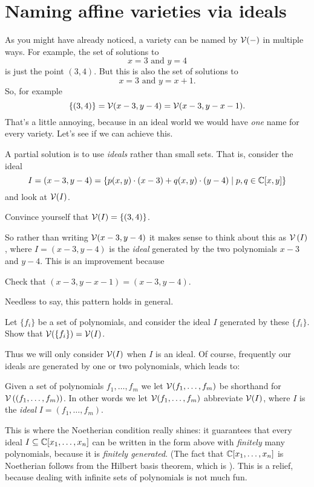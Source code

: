 \section{Naming affine varieties via ideals}
As you might have already noticed, a variety can be named by $\mathcal V(-)$ in multiple ways.
For example, the set of solutions to
\[ x=3 \text{ and } y=4 \]
is just the point $(3,4)$.
But this is also the set of solutions to
\[ x=3 \text{ and } y=x+1. \]
So, for example
\[ \{(3,4)\}
	= \mathcal V(x-3, y-4)
	= \mathcal V(x-3, y-x-1).
	\]
That's a little annoying, because in an ideal world we would have \emph{one} name
for every variety.
Let's see if we can achieve this.

A partial solution is to use \emph{ideals} rather than small sets.
That is, consider the ideal
\[
	I = \left( x-3, y-4 \right)
	= \left\{ p(x,y) \cdot (x-3) + q(x,y) \cdot (y-4)
	\mid p,q \in \mathbb C[x,y] \right\}
\]
and look at $\mathcal V(I)$.
\begin{ques}
	Convince yourself that $\mathcal V(I) = \{(3,4)\}$.
\end{ques}
So rather than writing $\mathcal V(x-3, y-4)$ it makes sense to
think about this as $\mathcal V\left( I \right)$, where $I = (x-3,y-4)$ is the \emph{ideal}
generated by the two polynomials $x-3$ and $y-4$.
This is an improvement because
\begin{ques}
	Check that $(x-3, y-x-1) = (x-3, y-4)$.
\end{ques}

Needless to say, this pattern holds in general.
\begin{ques}
	Let $\{f_i\}$ be a set of polynomials, and consider
	the ideal $I$ generated by these $\{f_i\}$.
	Show that $\mathcal V(\{f_i\}) = \mathcal V(I)$.
\end{ques}

Thus we will only consider $\mathcal V(I)$ when $I$ is an ideal.
Of course, frequently our ideals are generated by one or two polynomials,
which leads to:
\begin{abuse}
	Given a set of polynomials $f_1, \dots, f_m$
	we let $\mathcal V(f_1, \dots, f_m)$ be shorthand for
	$\mathcal V\left( \left( f_1, \dots, f_m \right) \right)$.
	In other words we let $\mathcal V(f_1, \dots, f_m)$
	abbreviate $\mathcal V(I)$, where $I$ is the \emph{ideal} $I=(f_1, \dots, f_m)$.
\end{abuse}

This is where the Noetherian condition really shines:
it guarantees that every ideal $I \subseteq \mathbb C[x_1, \dots, x_n]$
can be written in the form above with \emph{finitely} many polynomials,
because it is \emph{finitely generated}.
(The fact that $\mathbb C[x_1, \dots, x_n]$ is Noetherian follows from the Hilbert basis theorem,
which is ).
This is a relief, because dealing with infinite sets of polynomials is not much fun.

